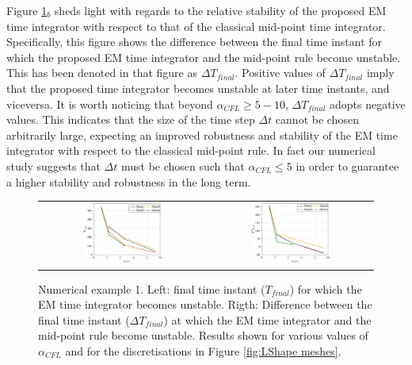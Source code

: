 Figure \ref{fig:CFL study}$_b$ sheds light with regards to the relative stability of the proposed EM time integrator with respect to that of the classical mid-point time integrator. Specifically, this figure shows the difference between the final time instant for which the proposed EM time integrator and the mid-point rule become unstable. This has been denoted in that figure as $\Delta T_{final}$.  Positive values of $\Delta T_{final}$ imply that the proposed time integrator becomes unstable at later time instants, and viceversa. It is worth noticing that beyond $\alpha_{CFL}\geq 5-10$,  $\Delta T_{final}$ adopts negative values. This indicates that the size of the time step $\Delta t$ cannot be chosen arbitrarily large, expecting an improved robustness and stability of the EM time integrator with respect to the classical mid-point rule. In fact our numerical study suggests that $\Delta t$ must be chosen such that $\alpha_{CFL}\leq 5$ in order to guarantee a higher stability and robustness in the long term.



\begin{figure}[hbtp]
	\centering
	\begin{tabular}{cc}
	\includegraphics[width=0.5\textwidth]{Figures/Example1/Tfinalv4.eps} &
\includegraphics[width=0.5\textwidth]{Figures/Example1/DTfinalv4.eps}
	\end{tabular}
	\caption{Numerical example 1. Left: final time instant ($T_{final}$) for which the EM time integrator becomes unstable. Rigth: Difference between the final time instant ($\Delta T_{final}$) at which the EM time integrator and the mid-point rule become unstable. Results shown for various values of $\alpha_{CFL}$ and for the discretisations in Figure \ref{fig:LShape meshes}.}
	\label{fig:CFL study}
\end{figure}


